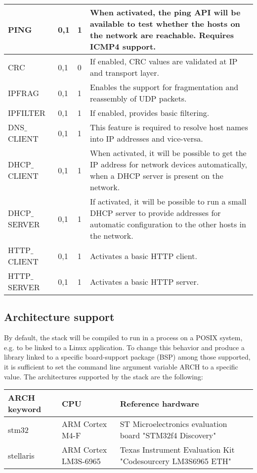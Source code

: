 \begin{longtable}{ | l | l | l | p{5cm} | }
PING&
0,1&
1&
When activated, the ping API will be available to test whether the hosts on the network are reachable.
Requires ICMP4 support.
\\ \hline

CRC&
0,1&
0&
If enabled, CRC values are validated at IP and transport layer.
\\ \hline

IPFRAG&
0,1&
1&
Enables the support for fragmentation and reassembly of UDP packets.
\\ \hline

IPFILTER&
0,1&
1&
If enabled, provides basic filtering.
\\ \hline

DNS$\_$CLIENT&
0,1&
1&
This feature is required to resolve host names into IP addresses and vice-versa.
\\ \hline

DHCP$\_$CLIENT&
0,1&
1&
When activated, it will be possible to get the IP address for network devices automatically, when a DHCP
server is present on the network.
\\ \hline

DHCP$\_$SERVER&
0,1&
1&
If activated, it will be possible to run a small DHCP server to provide addresses for automatic configuration
to the other hosts in the network.
\\ \hline

HTTP$\_$CLIENT&
0,1&
1&
Activates a basic HTTP client.
\\ \hline

HTTP$\_$SERVER&
0,1&
1&
Activates a basic HTTP server.
\\ \hline

\end{longtable}

\subsection{Architecture support}
By default, the stack will be compiled to run in a process on a POSIX
system, e.g. to be linked to a Linux application. To change this behavior
and produce a library linked to a specific board-support package (BSP)
among those supported, it is sufficient to set the command line argument
variable ARCH to a specific value. The architectures supported by the stack
are the following:


\begin{longtable}{ | l | l | p{5cm} | }
\hline
{\bf ARCH keyword} &
{\bf CPU} &
{\bf Reference hardware}
\\ \hline

stm32&
ARM Cortex M4-F&
ST Microelectronics evaluation board "STM32f4 Discovery"
\\ \hline

stellaris&
ARM Cortex LM3S-6965&
Texas Instrument Evaluation Kit "Codesourcery LM3S6965 ETH"
\\ \hline

\end{longtable}



